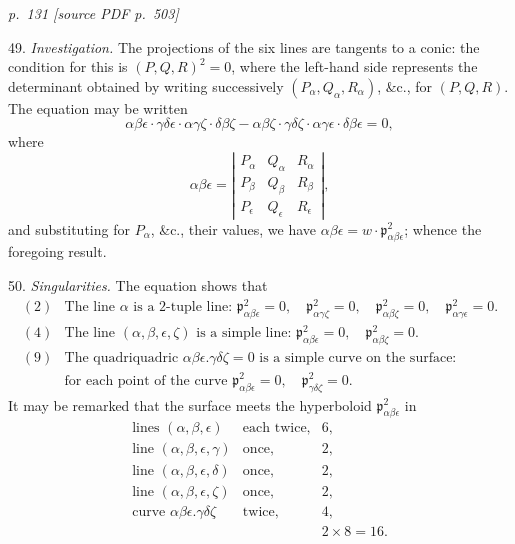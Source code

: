 \documentclass[11pt,a4paper]{article}
\newcommand{\sourcepage}[2]{%
  \bigskip
  \noindent\textit{p.~#1 [source PDF p.~#2]}%
  \par\smallskip
}
\newcommand{\p}{\mathfrak p}
\begin{document}
\sourcepage{131}{503}
49. \textit{Investigation.} The projections of the six lines are tangents to a conic:
the condition for this is $(P,Q,R)^2=0$, where the left-hand side represents the
determinant obtained by writing successively $(P_\alpha,Q_\alpha,R_\alpha)$, \&c.,
for $(P,Q,R)$. The equation may be written
\[
\alpha\beta\epsilon\cdot\gamma\delta\epsilon\cdot
\alpha\gamma\zeta\cdot\delta\beta\zeta
-\alpha\beta\zeta\cdot\gamma\delta\zeta\cdot
\alpha\gamma\epsilon\cdot\delta\beta\epsilon=0,
\]
where
\[
\alpha\beta\epsilon=
\left|\begin{array}{ccc}
P_\alpha&Q_\alpha&R_\alpha\\
P_\beta&Q_\beta&R_\beta\\
P_\epsilon&Q_\epsilon&R_\epsilon
\end{array}\right|,
\]
and substituting for $P_\alpha$, \&c., their values, we have
$\alpha\beta\epsilon=w\cdot\p^2_{\alpha\beta\epsilon}$; whence the foregoing result.

50. \textit{Singularities.} The equation shows that
\[
\begin{array}{ll}
(2)&\text{The line }\alpha\text{ is a 2-tuple line: }
\p^2_{\alpha\beta\epsilon}=0,\quad
\p^2_{\alpha\gamma\zeta}=0,\quad
\p^2_{\alpha\beta\zeta}=0,\quad
\p^2_{\alpha\gamma\epsilon}=0.\\[2mm]
(4)&\text{The line }(\alpha,\beta,\epsilon,\zeta)\text{ is a simple line: }
\p^2_{\alpha\beta\epsilon}=0,\quad \p^2_{\alpha\beta\zeta}=0.\\[2mm]
(9)&\text{The quadriquadric }\alpha\beta\epsilon.\gamma\delta\zeta=0
\text{ is a simple curve on the surface: }\\
&\text{for each point of the curve }
\p^2_{\alpha\beta\epsilon}=0,\quad \p^2_{\gamma\delta\zeta}=0.
\end{array}
\]
It may be remarked that the surface meets the hyperboloid $\p^2_{\alpha\beta\epsilon}$ in
\[
\begin{array}{rcl}
\text{lines }(\alpha,\beta,\epsilon)&\text{each twice,}&6,\\
\text{line }(\alpha,\beta,\epsilon,\gamma)&\text{once,}&2,\\
\text{line }(\alpha,\beta,\epsilon,\delta)&\text{once,}&2,\\
\text{line }(\alpha,\beta,\epsilon,\zeta)&\text{once,}&2,\\
\text{curve }\alpha\beta\epsilon.\gamma\delta\zeta&\text{twice,}&4,\\
&&2\times8=16.
\end{array}
\]
\end{document}
